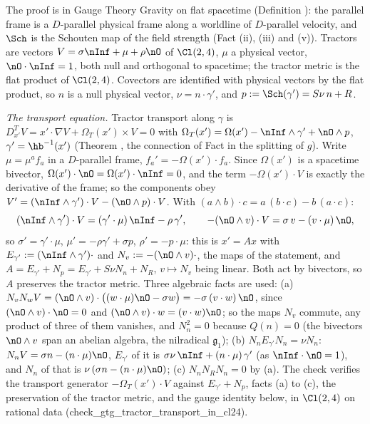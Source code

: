 The proof is in Gauge Theory Gravity on flat spacetime (Definition ): the parallel frame is a $D$-parallel physical frame along a worldline of $D$-parallel velocity, and $\Sch$ is the Schouten map of the field strength (Fact (ii), (iii) and (v)). Tractors are vectors $V = \sigma\nInf + \mu + \rho\nO$ of $\Cl(2,4)$, $\mu$ a physical vector, $\nO\cdot\nInf = 1$, both null and orthogonal to spacetime; the tractor metric is the flat product of $\Cl(2,4)$. Covectors are identified with physical vectors by the flat product, so $n$ is a null physical vector, $\nu = n\cdot\gamma'$, and $p := \Sch(\gamma') = S\nu\,n + R$.

\emph{The transport equation.} Tractor transport along $\gamma$ is $D^{T}_{x'}V = x'\cdot\nabla V + \Omega_{T}(x')\times V = 0$ with $\Omega_{T}(x') = \Omega(x') - \nInf\wedge\gamma' + \nO\wedge p$, $\gamma' = \hb^{-1}(x')$ (Theorem , the connection of Fact  in the splitting of $g$). Write $\mu = \mu^{a}f_{a}$ in a $D$-parallel frame, $f_{a}' = -\Omega(x')\cdot f_{a}$. Since $\Omega(x')$ is a spacetime bivector, $\Omega(x')\cdot\nO = \Omega(x')\cdot\nInf = 0$, and the term $-\Omega(x')\cdot V$ is exactly the derivative of the frame; so the components obey $V' = (\nInf\wedge\gamma')\cdot V - (\nO\wedge p)\cdot V$. With $(a\wedge b)\cdot c = a\,(b\cdot c) - b\,(a\cdot c)$:
\[
(\nInf\wedge\gamma')\cdot V = (\gamma'\cdot\mu)\,\nInf - \rho\,\gamma', \qquad -(\nO\wedge v)\cdot V = \sigma\,v - (v\cdot\mu)\,\nO ,
\]
so $\sigma' = \gamma'\cdot\mu$, $\mu' = -\rho\gamma' + \sigma p$, $\rho' = -p\cdot\mu$: this is $x' = Ax$ with $E_{\gamma'} := (\nInf\wedge\gamma')\cdot$ and $N_{v} := -(\nO\wedge v)\cdot$, the maps of the statement, and $A = E_{\gamma'} + N_{p} = E_{\gamma'} + S\nu N_{n} + N_{R}$, $v \mapsto N_{v}$ being linear. Both act by bivectors, so $A$ preserves the tractor metric. Three algebraic facts are used: (a) $N_{v}N_{w}V = (\nO\wedge v)\cdot\bigl((w\cdot\mu)\nO - \sigma w\bigr) = -\sigma\,(v\cdot w)\,\nO$, since $(\nO\wedge v)\cdot\nO = 0$ and $(\nO\wedge v)\cdot w = (v\cdot w)\nO$; so the maps $N_{v}$ commute, any product of three of them vanishes, and $N_{n}^{2} = 0$ because $Q(n) = 0$ (the bivectors $\nO\wedge v$ span an abelian algebra, the nilradical $\mathfrak g_{1}$); (b) $N_{n}E_{\gamma'}N_{n} = \nu N_{n}$: $N_{n}V = \sigma n - (n\cdot\mu)\nO$, $E_{\gamma'}$ of it is $\sigma\nu\,\nInf + (n\cdot\mu)\,\gamma'$ (as $\nInf\cdot\nO = 1$), and $N_{n}$ of that is $\nu\,(\sigma n - (n\cdot\mu)\nO)$; (c) $N_{n}N_{R}N_{n} = 0$ by (a). The check verifies the transport generator $-\Omega_{T}(x')\cdot V$ against $E_{\gamma'} + N_{p}$, facts (a) to (c), the preservation of the tractor metric, and the gauge identity below, in $\Cl(2,4)$ on rational data (check\_gtg\_tractor\_transport\_in\_cl24).

